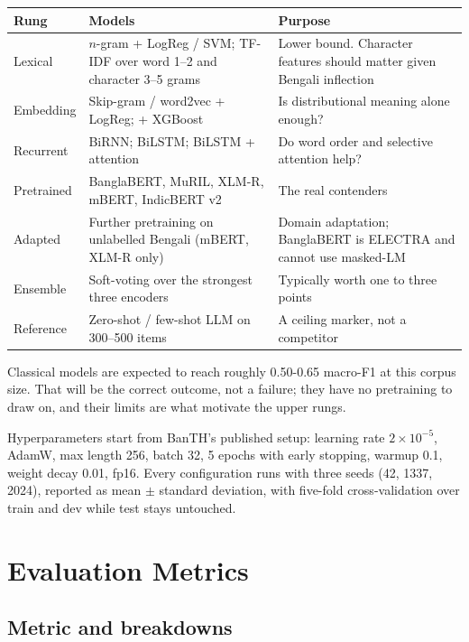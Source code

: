 \documentclass[12pt,a4paper]{article}
\begin{document}
\begin{center}
\begin{tabular}{L{2.4cm} L{5.4cm} L{5.4cm}}
\toprule
\textbf{Rung} & \textbf{Models} & \textbf{Purpose} \\
\midrule
Lexical & $n$-gram + LogReg / SVM; TF-IDF over word 1--2 and character 3--5
grams & Lower bound. Character features should matter given Bengali inflection \\
\addlinespace
Embedding & Skip-gram / word2vec + LogReg; + XGBoost &
Is distributional meaning alone enough? \\
\addlinespace
Recurrent & BiRNN; BiLSTM; BiLSTM + attention &
Do word order and selective attention help? \\
\addlinespace
Pretrained & BanglaBERT, MuRIL, XLM-R, mBERT, IndicBERT v2 &
The real contenders \\
\addlinespace
Adapted & Further pretraining on unlabelled Bengali (mBERT, XLM-R only) &
Domain adaptation; BanglaBERT is ELECTRA and cannot use masked-LM \\
\addlinespace
Ensemble & Soft-voting over the strongest three encoders &
Typically worth one to three points \\
\addlinespace
Reference & Zero-shot / few-shot LLM on 300--500 items &
A ceiling marker, not a competitor \\
\bottomrule
\end{tabular}
\end{center}

Classical models are expected to reach roughly 0.50-0.65 macro-F1 at this
corpus size. That will be the correct outcome, not a failure; they have
no pretraining to draw on, and their limits are what motivate the upper rungs.

Hyperparameters start from BanTH's published setup: learning rate
$2 \times 10^{-5}$, AdamW, max length 256, batch 32, 5 epochs with early
stopping, warmup 0.1, weight decay 0.01, fp16. Every configuration runs with
three seeds (42, 1337, 2024), reported as mean $\pm$ standard deviation, with
five-fold cross-validation over train and dev while test stays untouched.


\section{Evaluation Metrics}

\subsection{Metric and breakdowns}
\end{document}
